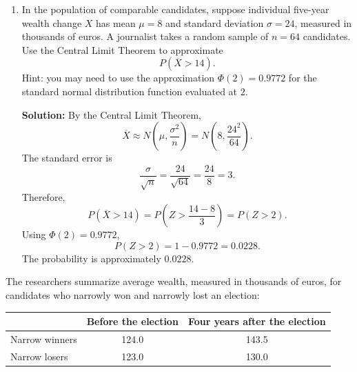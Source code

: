\documentclass[11pt]{exam}
\begin{document}
\begin{questions}
\begin{enumerate}[leftmargin = 0.5cm, label = (\alph*), rightmargin = 0.2cm]
    \begin{solutionorbox}[7.2cm]
    \textbf{Solution:} First compute $P(A)$ using the Law of Total Probability:
    \[
    P(A)=P(A\mid C)P(C)+P(A\mid C^c)P(C^c).
    \]
    Since $P(C^c)=1-0.06=0.94$,
    \[
    P(A)=0.85\cdot 0.06+0.14\cdot 0.94=0.051+0.1316=0.1826.
    \]
    By Bayes' theorem,
    \[
    P(C\mid A)=\frac{P(A\mid C)P(C)}{P(A)}=\frac{0.85\cdot 0.06}{0.1826}=\frac{0.051}{0.1826}\approx 0.2793.
    \]
    Thus, after observing a positive audit flag, the probability of hidden illicit income is about $0.2793$.
    \end{solutionorbox}

    \item In the population of comparable candidates, suppose individual five-year wealth change $X$ has mean $\mu=8$ and standard deviation $\sigma=24$, measured in thousands of euros. A journalist takes a random sample of $n=64$ candidates. Use the Central Limit Theorem to approximate
    \[
    P(\overline X>14).
    \]
    {\footnotesize Hint: you may need to use the approximation $\Phi(2)=0.9772$ for the standard normal distribution function evaluated at $2$.}

    \begin{solutionorbox}[6.2cm]
    \textbf{Solution:} By the Central Limit Theorem,
    \[
    \overline X \approx N\left(\mu,\frac{\sigma^2}{n}\right)
    =N\left(8,\frac{24^2}{64}\right).
    \]
    The standard error is
    \[
    \frac{\sigma}{\sqrt n}=\frac{24}{\sqrt{64}}=\frac{24}{8}=3.
    \]
    Therefore,
    \[
    P(\overline X>14)=P\left(Z>\frac{14-8}{3}\right)=P(Z>2).
    \]
    Using $\Phi(2)=0.9772$,
    \[
    P(Z>2)=1-0.9772=0.0228.
    \]
    The probability is approximately $0.0228$.
    \end{solutionorbox}
\end{enumerate}

\question[2]
The researchers summarize average wealth, measured in thousands of euros, for candidates who narrowly won and narrowly lost an election:

\begin{center}
\begin{tabular}{lcc}
\hline
 & Before the election & Four years after the election \\
\hline
Narrow winners & 124.0 & 143.5 \\
Narrow losers & 123.0 & 130.0 \\
\hline
\end{tabular}
\end{center}


\end{questions}
\end{document}
